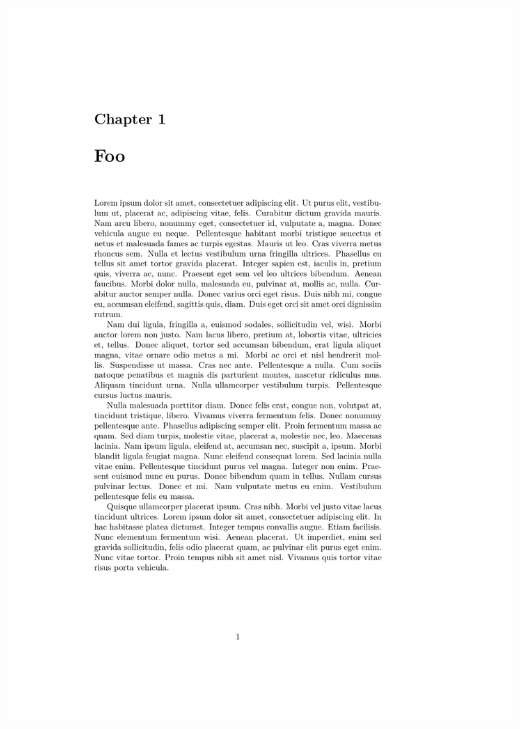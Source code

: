 \documentclass{beamer}
\begin{document}
\begin{frame}[fragile]
\begin{overprint}
\begin{columns}
      \begin{column}{0.5\textwidth}
        \begin{latexcode}
          \renewcommand*{\chapterheadstart}{}
        \end{latexcode}
        \begin{center}
          \includegraphics[frame,page=1,width=0.8\linewidth]{chapterheadstart-3}
        \end{center}
      \end{column}
    \end{columns}
  \end{overprint}
\end{frame}
\end{document}
